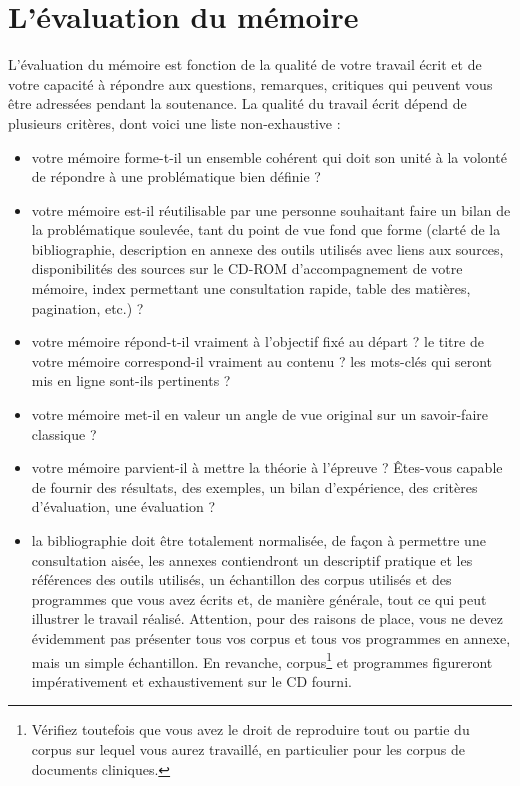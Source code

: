 \section{L'évaluation du mémoire}
L'évaluation du mémoire est fonction de la qualité de votre travail écrit et de votre capacité à répondre aux questions, remarques, critiques qui peuvent vous être adressées pendant la soutenance. La qualité du travail écrit dépend de plusieurs critères, dont voici une liste non-exhaustive :
\begin{itemize}
\item votre mémoire forme-t-il un ensemble cohérent qui doit son unité à la volonté de répondre à une problématique bien définie ?
\item votre mémoire est-il réutilisable par une personne souhaitant faire un bilan de la problématique soulevée, tant du point de vue fond que forme (clarté de la bibliographie, description en annexe des outils utilisés avec liens aux sources, disponibilités des sources sur le CD-ROM d'accompagnement de votre mémoire, index permettant une consultation rapide, table des matières, pagination, etc.) ?
\item votre mémoire répond-t-il vraiment à l'objectif fixé au départ ? le titre de votre mémoire correspond-il vraiment au contenu ? les mots-clés qui seront mis en ligne sont-ils pertinents ?
\item votre mémoire met-il en valeur un angle de vue original sur un savoir-faire classique ?
\item votre mémoire parvient-il à mettre la théorie à l'épreuve ? \^Etes-vous capable de fournir des résultats, des exemples, un bilan d'expérience, des critères d'évaluation, une évaluation ?
\item la bibliographie doit être totalement normalisée, de façon à permettre une consultation aisée, les annexes contiendront un descriptif pratique et les références des outils utilisés, un échantillon des corpus utilisés et des programmes que vous avez écrits et, de manière générale, tout ce qui peut illustrer le travail réalisé. Attention, pour des raisons de place, vous ne devez évidemment pas présenter tous vos corpus et tous vos programmes en annexe, mais un simple échantillon. En revanche, corpus\footnote{Vérifiez toutefois que vous avez le droit de reproduire tout ou partie du corpus sur lequel vous aurez travaillé, en particulier pour les corpus de documents cliniques.} et programmes figureront impérativement et exhaustivement sur le CD fourni.
\end{itemize}

